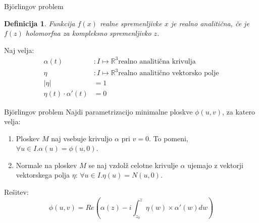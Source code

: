 \documentclass{beamer}
\newtheorem{definicija}{Definicija}
\newcommand{\R}{\mathbb R}
\begin{document}
\begin{frame}{Björlingov problem}
    \begin{definicija}
        Funkcija $f(x)$ realne spremenljivke $x$ je \emph{realno analitična}, če je $f(z)$ 
        holomorfna za kompleksno spremenljivko $z$.
    \end{definicija}

    Naj velja:
    \begin{align*}
        \alpha (t) &: I \mapsto \R^3 \text{realno analitična krivulja} \\
        \eta &: I \mapsto \R^3 \text{realno analitično vektorsko polje} \\
        \left\lvert \eta \right\rvert &= 1 \\
        \eta (t) \cdot \alpha' (t) &= 0
    \end{align*}
\end{frame}

\begin{frame}{Björlingov problem}
    Najdi parametrizacijo minimalne ploskve $\phi (u, v)$, za katero velja:
    \begin{enumerate}
        \item Ploskev $M$ naj vsebuje krivuljo $\alpha$ pri $v = 0$. To pomeni, $\forall u \in I. \alpha (u) = \phi (u, 0)$.
        \item Normale na ploskev $M$ se naj vzdolž celotne krivulje $\alpha$ ujemajo z vektorji vektorskega polja $\eta$: 
        $\forall u \in I. \eta (u) = N(u, 0)$.
    \end{enumerate}

    Rešitev:
    $$ \phi (u, v) = Re \left( \alpha (z) - i \int_{z_0}^{z} \eta (w) \times \alpha' (w) dw \right) $$
\end{frame}
    
\end{document}
